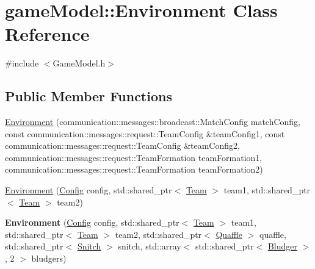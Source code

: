 \hypertarget{classgame_model_1_1_environment}{\section{game\-Model\-:\-:Environment Class Reference}
\label{classgame_model_1_1_environment}
}


{\ttfamily \#include $<$Game\-Model.\-h$>$}

\subsection*{Public Member Functions}
\begin{DoxyCompactItemize}
\item 
\hyperlink{classgame_model_1_1_environment_adbd10b9cd7a613334d51a4fa8536bdc0}{Environment} (communication\-::messages\-::broadcast\-::\-Match\-Config match\-Config, const communication\-::messages\-::request\-::\-Team\-Config \&team\-Config1, const communication\-::messages\-::request\-::\-Team\-Config \&team\-Config2, communication\-::messages\-::request\-::\-Team\-Formation team\-Formation1, communication\-::messages\-::request\-::\-Team\-Formation team\-Formation2)
\item 
\hyperlink{classgame_model_1_1_environment_a0b0292d09728665fce5cd2e175968c20}{Environment} (\hyperlink{classgame_model_1_1_config}{Config} config, std\-::shared\-\_\-ptr$<$ \hyperlink{classgame_model_1_1_team}{Team} $>$ team1, std\-::shared\-\_\-ptr$<$ \hyperlink{classgame_model_1_1_team}{Team} $>$ team2)
\item 
\hypertarget{classgame_model_1_1_environment_a3252830b5b67df1ed22a766660d76e4f}{{\bfseries Environment} (\hyperlink{classgame_model_1_1_config}{Config} config, std\-::shared\-\_\-ptr$<$ \hyperlink{classgame_model_1_1_team}{Team} $>$ team1, std\-::shared\-\_\-ptr$<$ \hyperlink{classgame_model_1_1_team}{Team} $>$ team2, std\-::shared\-\_\-ptr$<$ \hyperlink{classgame_model_1_1_quaffle}{Quaffle} $>$ quaffle, std\-::shared\-\_\-ptr$<$ \hyperlink{classgame_model_1_1_snitch}{Snitch} $>$ snitch, std\-::array$<$ std\-::shared\-\_\-ptr$<$ \hyperlink{classgame_model_1_1_bludger}{Bludger} $>$, 2 $>$ bludgers)}\label{classgame_model_1_1_environment_a3252830b5b67df1ed22a766660d76e4f}


\end{DoxyCompactItemize}
